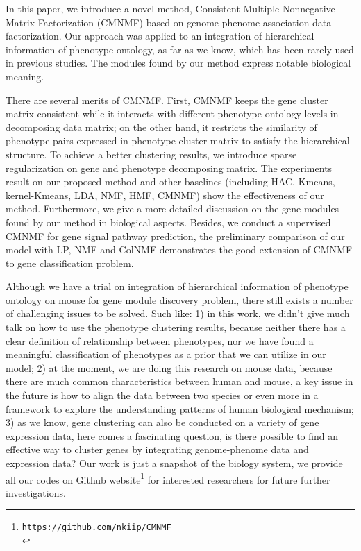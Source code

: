 \documentclass{bmcart}
\begin{document}
In this paper, we introduce a novel method, Consistent Multiple Nonnegative Matrix Factorization (CMNMF) based on genome-phenome association data factorization. Our approach was applied to an integration of hierarchical information of phenotype ontology, as far as we know, which has been rarely used in previous studies. The modules found by our method express notable biological meaning.

There are several merits of CMNMF. First, CMNMF keeps the gene cluster matrix consistent while it interacts with different phenotype ontology levels in decomposing data matrix; on the other hand, it restricts the similarity of phenotype pairs expressed in phenotype cluster matrix to satisfy the hierarchical structure. To achieve a better clustering results, we introduce sparse regularization on gene and phenotype decomposing matrix. The experiments result on our proposed method and other baselines (including HAC, Kmeans, kernel-Kmeans, LDA, NMF, HMF, CMNMF) show the effectiveness of our method. Furthermore, we give a more detailed discussion on the gene modules found by our method in biological aspects. Besides, we conduct a supervised CMNMF for gene signal pathway prediction, the preliminary comparison of our model with LP, NMF and ColNMF demonstrates the good extension of CMNMF to gene classification problem.

Although we have a trial on integration of hierarchical information of phenotype ontology on mouse for gene module discovery problem, there still exists a number of challenging issues to be solved. Such like: 1) in this work, we didn't give much talk on how to use the phenotype clustering results, because neither there has a clear definition of relationship between phenotypes, nor we have found a meaningful classification of phenotypes as a prior that we can utilize in our model; 2) at the moment, we are doing this research on mouse data, because there are much common characteristics between human and mouse, a key issue in the future is how to align the data between two species or even more in a framework to explore the understanding patterns of human biological mechanism; 3) as we know, gene clustering can also be conducted on a variety of gene expression data, here comes a fascinating question, is there possible to find an effective way to cluster genes by integrating genome-phenome data and expression data? Our work is just a snapshot of the biology system, we provide all our codes on Github website\footnote{\texttt{https://github.com/nkiip/CMNMF}\\} for interested researchers for future further investigations.
\end{document}
